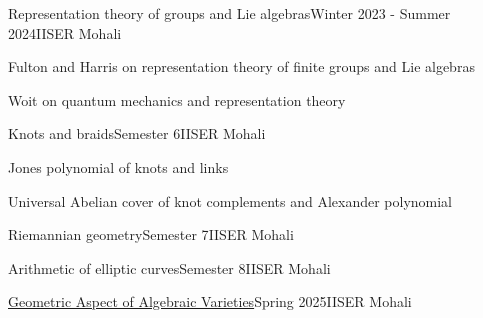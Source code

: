 \documentclass{LoLaTeXcv}
\begin{document}

\begin{lltxJob}{Representation theory of groups and Lie algebras}{Winter 2023 - Summer 2024}{IISER Mohali}
	\item Fulton and Harris on representation theory of finite groups and Lie algebras
	\item Woit on quantum mechanics and representation theory
\end{lltxJob}


\begin{lltxJob}{Knots and braids}{Semester 6}{IISER Mohali}
	\item Jones polynomial of knots and links
	\item Universal Abelian cover of knot complements and Alexander polynomial
\end{lltxJob}

\begin{lltsJob}{Riemannian geometry}{Semester 7}{IISER Mohali}
\end{lltsJob}

\begin{lltsJob}{Arithmetic of elliptic curves}{Semester 8}{IISER Mohali}
\end{lltsJob}

\begin{lltsJob}{\href{https://www.iisermohali.ac.in/events/conferences/geometric-aspect-of-algebraic-varieties-gaav-2025}{Geometric Aspect of Algebraic Varieties}}{Spring 2025}{IISER Mohali}
\end{lltsJob}
\end{document}

